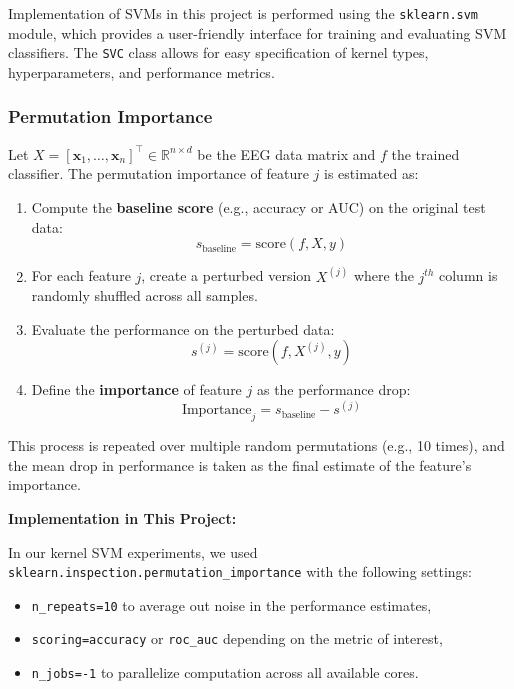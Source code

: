 \documentclass[
  letterpaper,
  DIV=11,
  numbers=noendperiod]{scrartcl}
\providecommand{\tightlist}{%
  \setlength{\itemsep}{0pt}\setlength{\parskip}{0pt}}\usepackage{longtable,booktabs,array}
\begin{document}
Implementation of SVMs in this project is performed using the
\texttt{sklearn.svm} module, which provides a user-friendly interface
for training and evaluating SVM classifiers. The \texttt{SVC} class
allows for easy specification of kernel types, hyperparameters, and
performance metrics.

\subsubsection{Permutation Importance}\label{permutation-importance}

Let
\(X = [\mathbf{x}_1, \dots, \mathbf{x}_n]^\top \in \mathbb{R}^{n \times d}\)
be the EEG data matrix and \(f\) the trained classifier. The permutation
importance of feature \(j\) is estimated as:

\begin{enumerate}
\def\labelenumi{\arabic{enumi}.}
\item
  Compute the \textbf{baseline score} (e.g., accuracy or AUC) on the
  original test data:\\
  \[
  s_{\text{baseline}} = \text{score}(f, X, y)
  \]
\item
  For each feature \(j\), create a perturbed version \(X^{(j)}\) where
  the \(j^{th}\) column is randomly shuffled across all samples.
\item
  Evaluate the performance on the perturbed data:\\
  \[
  s^{(j)} = \text{score}(f, X^{(j)}, y)
  \]
\item
  Define the \textbf{importance} of feature \(j\) as the performance
  drop: \[
  \text{Importance}_j = s_{\text{baseline}} - s^{(j)}
  \]
\end{enumerate}

This process is repeated over multiple random permutations (e.g., 10
times), and the mean drop in performance is taken as the final estimate
of the feature's importance.

\textbf{Implementation in This Project:}

In our kernel SVM experiments, we used
\texttt{sklearn.inspection.permutation\_importance} with the following
settings:

\begin{itemize}
\tightlist
\item
  \texttt{n\_repeats=10} to average out noise in the performance
  estimates,
\item
  \texttt{scoring=\textquotesingle{}accuracy\textquotesingle{}} or
  \texttt{\textquotesingle{}roc\_auc\textquotesingle{}} depending on the
  metric of interest,
\item
  \texttt{n\_jobs=-1} to parallelize computation across all available
  cores.
\end{itemize}
\end{document}
